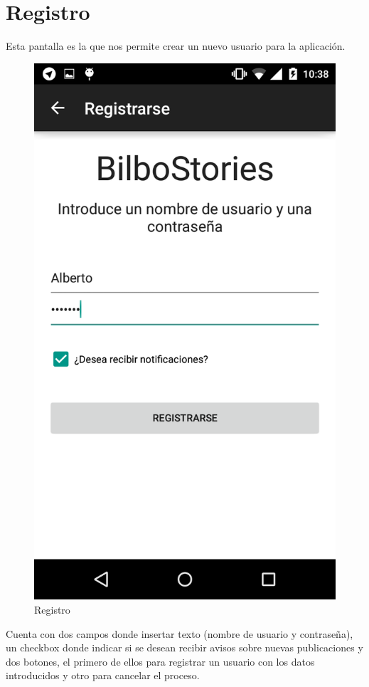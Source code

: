 \documentclass[11pt,a4paper, titlepage]{article}
\begin{document}
	\section[Registro]{Registro}
	\label{regis}
	
	Esta pantalla es la que nos permite crear un nuevo usuario para la aplicación. 
	
	\begin{figure}[hbtp]
		\centering
		\includegraphics[scale = 0.25 ]{img/2}
		\caption{Registro}
		\label{p14}
	\end{figure}
Cuenta con dos campos donde insertar texto (nombre de usuario y contraseña), un checkbox donde indicar si se desean recibir avisos sobre nuevas publicaciones y dos botones, el primero de ellos para registrar un usuario con los datos introducidos y otro para cancelar el proceso.
\end{document}
